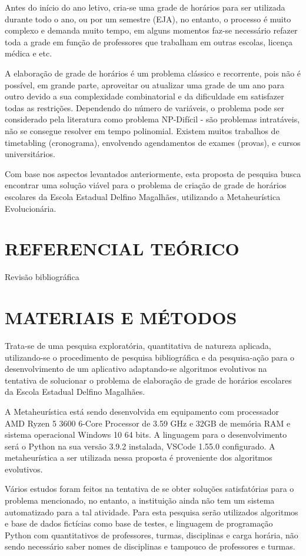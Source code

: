\documentclass[12pt,fleqn]{article}
\begin{document}
Antes do início do ano letivo, cria-se uma grade de horários para ser utilizada durante todo o ano, ou por um semestre (EJA), no entanto, o processo é muito complexo e demanda muito tempo, em alguns momentos faz-se necessário refazer toda a grade em função de professores que trabalham em outras escolas, licença médica e etc.

A elaboração de grade de horários é um problema clássico e recorrente, pois não é possível, em grande parte, aproveitar ou atualizar uma grade de um ano para outro devido a sua complexidade combinatorial e da dificuldade em satisfazer todas as restrições. Dependendo do número de variáveis, o problema pode ser considerado pela literatura como problema NP-Difícil - são problemas intratáveis, não se consegue resolver em tempo polinomial. Existem muitos trabalhos de timetabling (cronograma), envolvendo agendamentos de exames (provas), e cursos universitários.

Com base nos aspectos levantados anteriormente, esta proposta de pesquisa busca encontrar uma solução viável para o problema de criação de grade de horários escolares da Escola Estadual Delfino Magalhães, utilizando a Metaheurística Evolucionária.

\section{REFERENCIAL TEÓRICO}
Revisão bibliográfica

\section{MATERIAIS E MÉTODOS}
Trata-se de uma pesquisa exploratória, quantitativa de natureza aplicada, utilizando-se o procedimento de pesquisa bibliográfica e da pesquisa-ação para o desenvolvimento de um aplicativo adaptando-se algoritmos evolutivos na tentativa de solucionar o problema de elaboração de grade de horários escolares da Escola Estadual Delfino Magalhães. 

A Metaheurística está sendo desenvolvida em equipamento com processador AMD Ryzen 5 3600 6-Core Processor de 3.59 GHz e 32GB de memória RAM e sistema operacional Windows 10 64 bits. A linguagem para o desenvolvimento será o Python na sua versão 3.9.2 instalada, VSCode 1.55.0 configurado. A metaheurística a ser utilizada nessa proposta é proveniente dos algoritmos evolutivos.

Vários estudos foram feitos na tentativa de se obter soluções satisfatórias para o problema mencionado, no entanto, a instituição ainda não tem um sistema automatizado para a tal atividade. Para esta pesquisa serão utilizados algoritmos e base de dados fictícias como base de testes, e linguagem de programação Python com quantitativos de professores, turmas, disciplinas e carga horária, não sendo necessário saber nomes de disciplinas e tampouco de professores e turmas.
\end{document}
